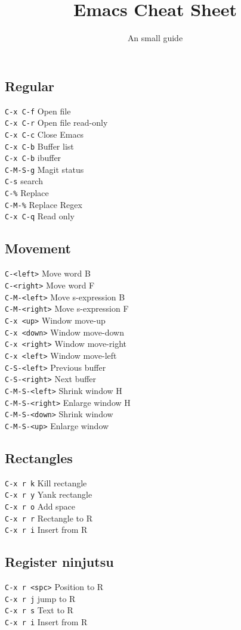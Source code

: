 \documentclass{article}
\title{\vspace{-1.5cm} Emacs Cheat Sheet}
\author{An small guide}
\date{}
\begin{document}
\newcommand{\command}[2]{
  \texttt{#1} \hfill #2 \\
}

\begin{multicols*}{4}
\maketitle
\section*{Regular}

\command{C-x C-f}{Open file}
\command{C-x C-r}{Open file read-only}
\command{C-x C-c}{Close Emacs}
\command{C-x C-b}{Buffer list}
\command{C-x C-b}{ibuffer}
\command{C-M-S-g}{Magit status}
\command{C-s}{search}
\command{C-\%}{Replace}
\command{C-M-\%}{Replace Regex}
\command{C-x C-q}{Read only}

\subsection*{Movement}

\command{C-<left>}{Move word B}
\command{C-<right>}{Move word F}
\command{C-M-<left>}{Move s-expression B}
\command{C-M-<right>}{Move s-expression F}

\command{C-x <up>}{Window move-up}
\command{C-x <down>}{Window move-down}
\command{C-x <right>}{Window move-right}
\command{C-x <left>}{Window move-left}

\command{C-S-<left>}{Previous buffer}
\command{C-S-<right>}{Next buffer}
\command{C-M-S-<left>}{Shrink window H}
\command{C-M-S-<right>}{Enlarge window H}
\command{C-M-S-<down>}{Shrink window}
\command{C-M-S-<up>}{Enlarge window}

\subsection*{Rectangles}
\command{C-x r k}{Kill rectangle}
\command{C-x r y}{Yank rectangle}
\command{C-x r o}{Add space}
\command{C-x r r}{Rectangle to R}
\command{C-x r i}{Insert from R}

\subsection*{Register ninjutsu}

\command{C-x r <spc>}{Position to R}
\command{C-x r j}{jump to R}

\command{C-x r s}{Text to R}
\command{C-x r i}{Insert from R}


\end{multicols*}
\end{document}
